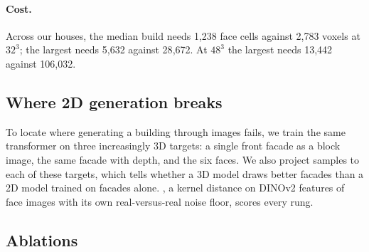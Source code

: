 \paragraph{Cost.}
Across our houses, the median build needs 1{,}238 face cells against 2{,}783 voxels at $32^3$; the
largest needs 5{,}632 against 28{,}672. At $48^3$ the largest needs 13{,}442 against 106{,}032.

\subsection{Where 2D generation breaks}
\label{sec:ladder}

To locate where generating a building through images fails, we train the same transformer on three
increasingly 3D targets: a single front facade as a block image, the same facade with depth, and the
six faces. We also project \voxelar{} samples to each of these targets, which tells whether a 3D model
draws better facades than a 2D model trained on facades alone. \facekid{}, a kernel distance on DINOv2
features of face images with its own real-versus-real noise floor, scores every rung.


\subsection{Ablations}
\label{sec:ablations}

